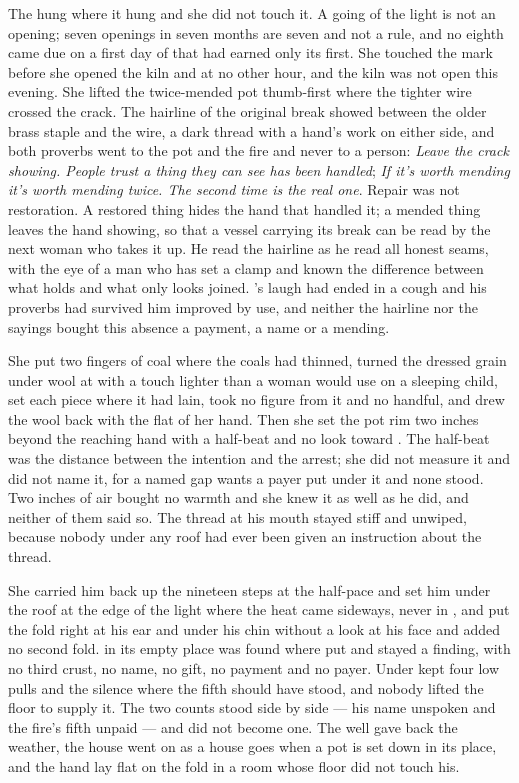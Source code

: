 The  hung where it hung and she did not touch it. A going of the light is not an opening; seven openings in seven months are seven and not a rule, and no eighth came due on a first day of  that had earned only its first. She touched the mark before she opened the kiln and at no other hour, and the kiln was not open this evening. She lifted the twice-mended pot thumb-first where the tighter wire crossed the crack. The hairline of the original break showed between the older brass staple and the wire, a dark thread with a hand's work on either side, and both proverbs went to the pot and the fire and never to a person: \emph{Leave the crack showing. People trust a thing they can see has been handled}; \emph{If it's worth mending it's worth mending twice. The second time is the real one}. Repair was not restoration. A restored thing hides the hand that handled it; a mended thing leaves the hand showing, so that a vessel carrying its break can be read by the next woman who takes it up. He read the hairline as he read all honest seams, with the eye of a man who has set a clamp and known the difference between what holds and what only looks joined. 's laugh had ended in a cough and his proverbs had survived him improved by use, and neither the hairline nor the sayings bought this absence a payment, a name or a mending.

She put two fingers of coal where the coals had thinned, turned the dressed grain under wool at  with a touch lighter than a woman would use on a sleeping child, set each piece where it had lain, took no figure from it and no handful, and drew the wool back with the flat of her hand. Then she set the pot rim two inches beyond the reaching hand with a half-beat and no look toward . The half-beat was the distance between the intention and the arrest; she did not measure it and did not name it, for a named gap wants a payer put under it and none stood. Two inches of air bought no warmth and she knew it as well as he did, and neither of them said so. The thread at his mouth stayed stiff and unwiped, because nobody under any roof had ever been given an instruction about the thread.

She carried him back up the nineteen steps at the half-pace and set him under the roof at the edge of the light where the heat came sideways, never in , and put the fold right at his ear and under his chin without a look at his face and added no second fold.  in its empty place was found where put and stayed a finding, with no third crust, no name, no gift, no payment and no payer. Under   kept four low pulls and the silence where the fifth should have stood, and nobody lifted the floor to supply it. The two counts stood side by side --- his name unspoken and the fire's fifth unpaid --- and did not become one. The well gave back the weather, the house went on as a house goes when a pot is set down in its place, and the hand lay flat on the fold in a room whose floor did not touch his.

